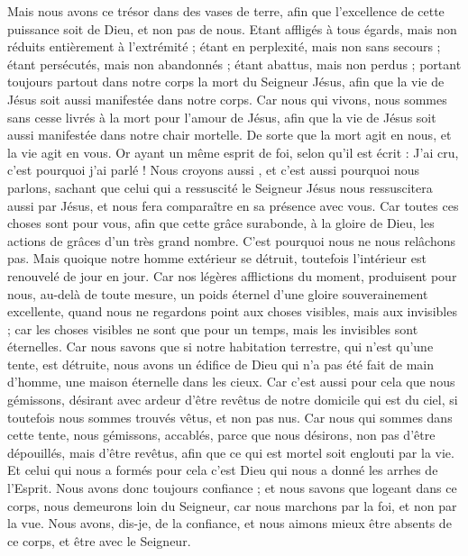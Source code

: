\begin{multicols}{2}
Mais nous avons ce trésor dans des vases de terre, afin que l'excellence de cette puissance soit de Dieu, et non pas de nous.
Etant affligés à tous égards, mais non réduits entièrement à l’extrémité ; étant en perplexité, mais non sans secours ;
étant persécutés, mais non abandonnés ; étant abattus, mais non perdus ;
portant toujours partout dans notre corps la mort du Seigneur Jésus, afin que la vie de Jésus soit aussi manifestée dans notre corps.
Car nous qui vivons, nous sommes sans cesse livrés à la mort pour l'amour de Jésus, afin que la vie de Jésus soit aussi manifestée dans notre chair mortelle.
De sorte que la mort agit en nous, et la vie agit en vous.
Or ayant un même esprit de foi, selon qu'il est écrit : J'ai cru, c'est pourquoi j'ai parlé ! Nous croyons aussi , et c'est aussi pourquoi nous parlons,
sachant que celui qui a ressuscité le Seigneur Jésus nous ressuscitera aussi par Jésus, et nous fera comparaître en sa présence avec vous.
Car toutes ces choses sont pour vous, afin que cette grâce surabonde, à la gloire de Dieu, les actions de grâces d’un très grand nombre.
C'est pourquoi nous ne nous relâchons pas. Mais quoique notre homme extérieur se détruit, toutefois l'intérieur est renouvelé de jour en jour.
Car nos légères afflictions du moment, produisent pour nous, au-delà de toute mesure, un poids éternel d'une gloire souverainement excellente,
quand nous ne regardons point aux choses visibles, mais aux invisibles ; car les choses visibles ne sont que pour un temps, mais les invisibles sont éternelles.
\VerseOne{} Car nous savons que si notre habitation terrestre, qui n'est qu'une tente, est détruite, nous avons un édifice de Dieu qui n’a pas été fait de main d’homme, une maison éternelle dans les cieux.
Car c'est aussi pour cela que nous gémissons, désirant avec ardeur d'être revêtus de notre domicile qui est du ciel,
si toutefois nous sommes trouvés vêtus, et non pas nus.
Car nous qui sommes dans cette tente, nous gémissons, accablés, parce que nous désirons, non pas d'être dépouillés, mais d'être revêtus, afin que ce qui est mortel soit englouti par la vie.
Et celui qui nous a formés pour cela c'est Dieu qui nous a donné les arrhes de l'Esprit.
Nous avons donc toujours confiance ; et nous savons que logeant dans ce corps, nous demeurons loin du Seigneur,
car nous marchons par la foi, et non par la vue.
Nous avons, dis-je, de la confiance, et nous aimons mieux être absents de ce corps, et être avec le Seigneur.

\end{multicols}
